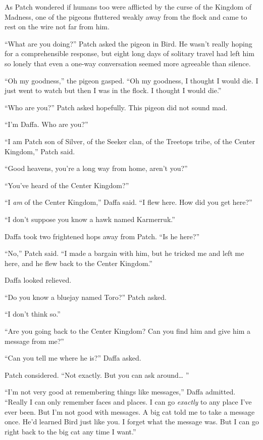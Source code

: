 \documentclass[ebook,oneside,openany,17pt]{memoir}
\begin{document}
As Patch wondered if humans too were afflicted by the curse of the
Kingdom of Madness, one of the pigeons fluttered weakly away from the
flock and came to rest on the wire not far from him.

“What are you doing?” Patch asked the pigeon in Bird. He wasn’t really
hoping for a comprehensible response, but eight long days of solitary
travel had left him so lonely that even a one-way conversation seemed
more agreeable than silence.

“Oh my goodness,” the pigeon gasped. “Oh my goodness, I thought I
would die. I just went to watch but then I was in the flock. I thought
I would die.”

“Who are you?” Patch asked hopefully. This pigeon did not sound mad.

“I’m Daffa. Who are you?”

“I am Patch son of Silver, of the Seeker clan, of the Treetops tribe,
of the Center Kingdom,” Patch said.

“Good heavens, you’re a long way from home, aren’t you?”

“You’ve heard of the Center Kingdom?”

“I \emph{am} of the Center Kingdom,” Daffa said. “I flew here. How
did you get here?”

“I don’t suppose you know a hawk named Karmerruk.”

Daffa took two frightened hops away from Patch. “Is he here?”

“No,” Patch said. “I made a bargain with him, but he tricked me and
left me here, and he flew back to the Center Kingdom.”

Daffa looked relieved.

“Do you know a bluejay named Toro?” Patch asked.

“I don’t think so.”

“Are you going back to the Center Kingdom? Can you find him and give
him a message from me?”

“Can you tell me where he is?” Daffa asked.

Patch considered. “Not exactly. But you can ask around… ”

“I’m not very good at remembering things like messages,” Daffa
admitted. “Really I can only remember faces and places. I can go
\emph{exactly} to any place I’ve ever been. But I’m not good with
messages. A big cat told me to take a message once. He’d learned Bird
just like you. I forget what the message was. But I can go right back
to the big cat any time I want.”
\end{document}
